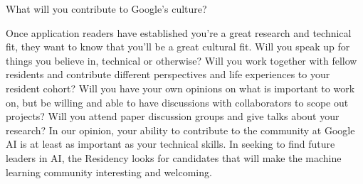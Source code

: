 \documentclass[letterpaper,10pt]{article}
\begin{document}
What will you contribute to Google's culture?

Once application readers have established you’re a great research and technical fit, they want to know that you’ll be a great cultural fit. Will you speak up for things you believe in, technical or otherwise? Will you work together with fellow residents and contribute different perspectives and life experiences to your resident cohort? Will you have your own opinions on what is important to work on, but be willing and able to have discussions with collaborators to scope out projects? Will you attend paper discussion groups and give talks about your research? In our opinion, your ability to contribute to the community at Google AI is at least as important as your technical skills. In seeking to find future leaders in AI, the Residency looks for candidates that will make the machine learning community interesting and welcoming. 

\end{document}
